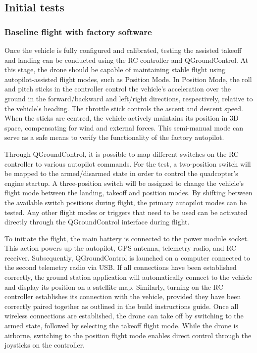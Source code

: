 \subsection{Initial tests}
\label{sec:test-8-flight}


\subsubsection{Baseline flight with factory software}
\label{subsec:fl-test-1}

Once the vehicle is fully configured and calibrated, testing the assisted takeoff and landing can be conducted using the RC controller and QGroundControl. At this stage, the drone should be capable of maintaining stable flight using autopilot-assisted flight modes, such as Position Mode. In Position Mode, the roll and pitch sticks in the controller control the vehicle's acceleration over the ground in the forward/backward and left/right directions, respectively, relative to the vehicle's heading. The throttle stick controls the ascent and descent speed. When the sticks are centred, the vehicle actively maintains its position in 3D space, compensating for wind and external forces. This semi-manual mode can serve as a safe means to verify the functionality of the factory autopilot.


Through QGroundControl, it is possible to map different switches on the RC controller to various autopilot commands. For the test, a two-position switch will be mapped to the armed/disarmed state in order to control the quadcopter's engine startup. A three-position switch will be assigned to change the vehicle's flight mode between the landing, takeoff and position modes. By shifting between the available switch positions during flight, the primary autopilot modes can be tested. Any other flight modes or triggers that need to be used can be activated directly through the QGroundControl interface during flight.



To initiate the flight, the main battery is connected to the power module socket. This action powers up the autopilot, GPS antenna, telemetry radio, and RC receiver. Subsequently, QGroundControl is launched on a computer connected to the second telemetry radio via USB. If all connections have been established correctly, the ground station application will automatically connect to the vehicle and display its position on a satellite map. Similarly, turning on the RC controller establishes its connection with the vehicle, provided they have been correctly paired together as outlined in the build instructions guide. Once all wireless connections are established, the drone can take off by switching to the armed state, followed by selecting the takeoff flight mode. While the drone is airborne, switching to the position flight mode enables direct control through the joysticks on the controller.


